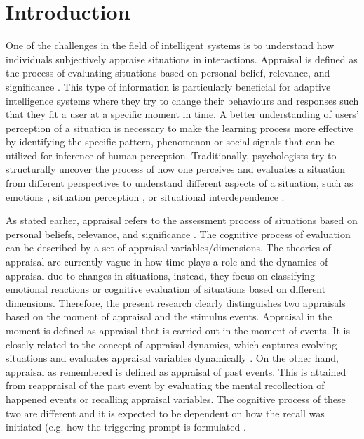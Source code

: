 \section{Introduction} \label{intro}
One of the challenges in the field of intelligent systems is to understand how individuals subjectively appraise situations in interactions. Appraisal is defined as the process of evaluating situations based on personal belief, relevance, and significance \cite{scherer2005emotions}. This type of information is particularly beneficial for adaptive intelligence systems where they try to change their behaviours and responses such that they fit a user at a specific moment in time. A better understanding of users' perception of a situation is necessary to make the learning process more effective by identifying the specific pattern, phenomenon or social signals that can be utilized for inference of human perception. Traditionally, psychologists try to structurally uncover the process of how one perceives and evaluates a situation from different perspectives to understand different aspects of a situation, such as emotions \cite{scherer2005emotions, scherer2013nature}, situation perception \cite{rauthmann2014situational}, or situational interdependence \cite{gerpott2017howdopeople}.


As stated earlier, appraisal refers to the assessment process of situations based on personal beliefs, relevance, and significance \cite{scherer2005emotions}. The cognitive process of evaluation can be described by a set of appraisal variables/dimensions. The theories of appraisal are currently vague in how time plays a role and the dynamics of appraisal due to changes in situations, instead, they focus on classifying emotional reactions or cognitive evaluation of situations based on different dimensions. Therefore, the present research clearly distinguishes two appraisals based on the moment of appraisal and the stimulus events. Appraisal in the moment is defined as appraisal that is carried out in the moment of events. It is closely related to the concept of appraisal dynamics, which captures evolving situations and evaluates appraisal variables dynamically \cite{marsella2009ema}. On the other hand, appraisal as remembered is defined as appraisal of past events. This is attained from reappraisal of the past event by evaluating the mental recollection of happened events or recalling appraisal variables. The cognitive process of these two are different and it is expected to be dependent on how the recall was initiated (e.g. how the triggering prompt is formulated \cite{FIND A SOURCE!}.


